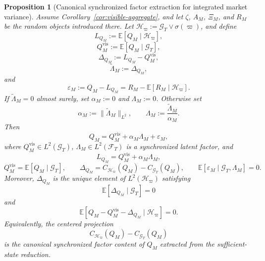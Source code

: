 \documentclass[11pt,a4paper]{amsart}
\theoremstyle{plain}
\newtheorem{proposition}[theorem]{Proposition}
\theoremstyle{definition}
\theoremstyle{remark}
\newcommand{\EE}{\mathbb{E}}
\newcommand{\cH}{\mathcal{H}}
\newcommand{\cF}{\mathcal{F}}
\newcommand{\cG}{\mathcal{G}}
\begin{document}
\begin{proposition}[Canonical synchronized factor extraction for integrated market variance]\label{prop:q-decomposition}
Assume Corollary~\ref{cor:visible-aggregate}, and let \(\zeta\), \(A_M\), \(\Xi_M\), and \(R_M\)
be the random objects introduced there.
Let \(\cH_\varpi:=\cG_T\vee\sigma(\varpi)\), and define
\[
        L_{Q_M}:=\EE[Q_M\mid \cH_\varpi],
\]
\[
        Q_M^{\mathrm{vis}}:=\EE[Q_M\mid \cG_T],
\]
\[
        \Delta_{Q_M}:=L_{Q_M}-Q_M^{\mathrm{vis}},
\]
\[
        \widetilde\Lambda_M
        :=\Delta_{Q_M},
\]
and
\[
        \varepsilon_M:=Q_M-L_{Q_M}=R_M-\EE[R_M\mid \cH_\varpi].
\]
If \(\widetilde\Lambda_M=0\) almost surely, set \(\alpha_M:=0\) and \(\Lambda_M:=0\).  Otherwise set
\[
        \alpha_M:=\|\widetilde\Lambda_M\|_{L^2},
        \qquad
        \Lambda_M:=\frac{\widetilde\Lambda_M}{\alpha_M}.
\]
Then
\[
        Q_M=Q_M^{\mathrm{vis}}+\alpha_M\Lambda_M+\varepsilon_M,
\]
where \(Q_M^{\mathrm{vis}}\in L^2(\cG_T)\), \(\Lambda_M\in L^2(\cF_T)\) is a synchronized latent
factor, and
\[
        L_{Q_M}=Q_M^{\mathrm{vis}}+\alpha_M\Lambda_M,
\]
\[
        Q_M^{\mathrm{vis}}=\EE[Q_M\mid \cG_T],
        \qquad
        \Delta_{Q_M}=C_{\cH_\varpi}(Q_M)-C_{\cG_T}(Q_M),
        \qquad
        \EE[\varepsilon_M\mid \cG_T,\Lambda_M]=0.
\]
Moreover, \(\Delta_{Q_M}\) is the unique element of \(L^2(\cH_\varpi)\) satisfying
\[
        \EE[\Delta_{Q_M}\mid \cG_T]=0
\]
and
\[
        \EE[Q_M-Q_M^{\mathrm{vis}}-\Delta_{Q_M}\mid \cH_\varpi]=0.
\]
Equivalently, the centered projection
\[
        C_{\cH_\varpi}(Q_M)-C_{\cG_T}(Q_M)
\]
is the canonical synchronized factor content of \(Q_M\) extracted from the sufficient-state
reduction.
\end{proposition}
\end{document}

